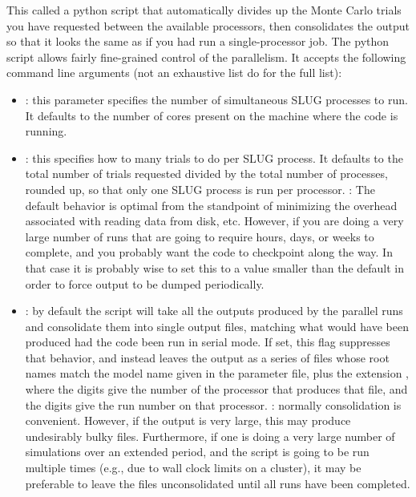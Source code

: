 \documentclass[letterpaper,10pt,english]{sphinxmanual}
\begin{document}
This called a python script that automatically divides up the Monte Carlo trials you have requested between the available processors, then consolidates the output so that it looks the same as if you had run a single-processor job. The python script allows fairly fine-grained control of the parallelism. It accepts the following command line arguments (not an exhaustive list \textendash{} do  for the full list):
\begin{itemize}
\item {} 
: this parameter specifies the number of simultaneous SLUG processes to run. It defaults to the number of cores present on the machine where the code is running.

\item {} 
: this specifies how to many trials to do per SLUG process. It defaults to the total number of trials requested divided by the total number of processes, rounded up, so that only one SLUG process is run per processor. : The default behavior is optimal from the standpoint of minimizing the overhead associated with reading data from disk, etc. However, if you are doing a very large number of runs that are going to require hours, days, or weeks to complete, and you probably want the code to checkpoint along the way. In that case it is probably wise to set this to a value smaller than the default in order to force output to be dumped periodically.

\item {} 
: by default the  script will take all the outputs produced by the parallel runs and consolidate them into single output files, matching what would have been produced had the code been run in serial mode. If set, this flag suppresses that behavior, and instead leaves the output as a series of files whose root names match the model name given in the parameter file, plus the extension , where the digits  give the number of the processor that produces that file, and the digits  give the run number on that processor. : normally consolidation is convenient. However, if the output is very large, this may produce undesirably bulky files. Furthermore, if one is doing a very large number of simulations over an extended period, and the  script is going to be run multiple times (e.g., due to wall clock limits on a cluster), it may be preferable to leave the files unconsolidated until all runs have been completed.

\end{itemize}
\end{document}
